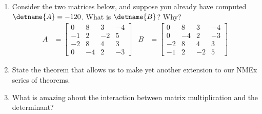 \begin{enumerate}
%
\item Consider the two matrices below, and suppose you already have computed $\detname{A}=-120$.  What is $\detname{B}$?  Why?
\begin{align*}
A&=
\begin{bmatrix}
 0 & 8 & 3 & -4 \\
 -1 & 2 & -2 & 5 \\
 -2 & 8 & 4 & 3 \\
 0 & -4 & 2 & -3
\end{bmatrix} 
&
B&=
\begin{bmatrix}
 0 & 8 & 3 & -4 \\
 0 & -4 & 2 & -3 \\
 -2 & 8 & 4 & 3 \\
 -1 & 2 & -2 & 5
\end{bmatrix} 
\end{align*}
%
\item State the theorem that allows us to make yet another extension to our NMEx series of theorems.
%
\item What is amazing about the interaction between matrix multiplication and the determinant?
%
\end{enumerate}